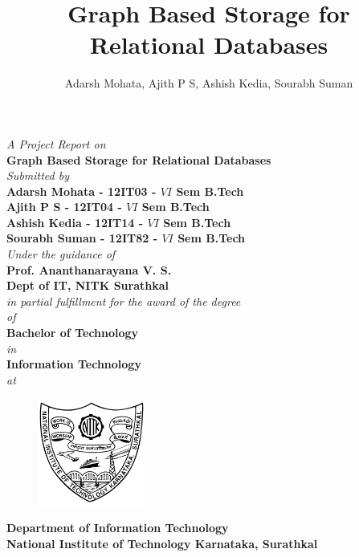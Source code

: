 \documentclass[12pt, oneside]{book}
\title{Graph Based Storage for Relational Databases}
\author{Adarsh Mohata, Ajith P S, Ashish Kedia, Sourabh Suman}
\newcommand{\project}{Graph Based Storage for Relational Databases}
\begin{document}
\begin{titlepage}
 \begin{center}
	\emph{A Project Report on} \\
\vspace{1cm}
\large
\textbf{\project} \\
\normalsize
\vspace{5mm}
\emph{Submitted by} \\
\vspace{5mm}
\textbf{Adarsh Mohata - 12IT03 - $VI$ Sem B.Tech} \\
\vspace{1mm}
\textbf{Ajith P S - 12IT04 - $VI$ Sem B.Tech} \\
\vspace{1mm}
\textbf{Ashish Kedia - 12IT14 - $VI$ Sem B.Tech} \\
\vspace{1mm}
\textbf{Sourabh Suman - 12IT82 - $VI$ Sem B.Tech} \\
\vspace{1cm}
\emph{Under the guidance of} \\
\vspace{1cm}
\textbf{Prof. Ananthanarayana V. S.} \\
\textbf{Dept of IT, NITK Surathkal} \\
\vspace{5mm}
\emph{in partial fulfillment for the award of the degree} \\
\vspace{5mm}
\emph{of} \\
\vspace{4mm}
\textbf{Bachelor of Technology} \\
\vspace{4mm}
\emph{in} \\
\vspace{4mm}
\textbf{Information Technology} \\
\vspace{5mm}
\emph{at} \\
\begin{figure}[H]
	\centering
	\includegraphics[height=3.5cm]{pics/nitk_logo.jpg}
\end{figure}
\vspace{1cm}
\textbf{Department of Information Technology} \\
\vspace{5mm}
\textbf{National Institute of Technology Karnataka, Surathkal} \\
\vspace{5mm}
\end{center}
\end{titlepage}
\end{document}
